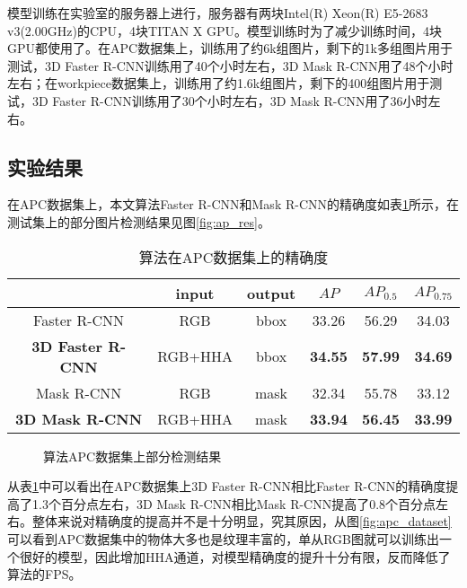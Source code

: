 {\kai 模型训练}在实验室的服务器上进行，服务器有两块Intel(R) Xeon(R) E5-2683 v3(2.00GHz)的CPU，4块TITAN X GPU。模型训练时为了减少训练时间，4块GPU都使用了。在APC数据集上，训练用了约6k组图片，剩下的1k多组图片用于测试，3D Faster R-CNN训练用了40个小时左右，3D Mask R-CNN用了48个小时左右；在workpiece数据集上，训练用了约1.6k组图片，剩下的400组图片用于测试，3D Faster R-CNN训练用了30个小时左右，3D Mask R-CNN用了36小时左右。

\subsection{实验结果}
在APC数据集上，本文算法Faster R-CNN和Mask R-CNN的精确度如表\ref{tab:ap1}所示，在测试集上的部分图片检测结果见图\ref{fig:ap_res}。
\begin{table}[ht]
  \centering
  \caption{算法在APC数据集上的精确度}
    \begin{tabular}{cccccc}
      \toprule
      &input&output&$AP$&$AP_{0.5}$&$AP_{0.75}$ \\
      \midrule
      Faster R-CNN&RGB&bbox&33.26&56.29&34.03 \\
      \bf{3D Faster R-CNN}&RGB+HHA&bbox&\bf{34.55}&\bf{57.99}&\bf{34.69} \\
      Mask R-CNN&RGB&mask&32.34&55.78&33.12 \\
      \bf{3D Mask R-CNN}&RGB+HHA&mask&\bf{33.94}&\bf{56.45}&\bf{33.99} \\
      \bottomrule
    \end{tabular}
  \label{tab:ap1}
\end{table}
\begin{figure}[ht]
  \centering
  \hskip0.2cm
  \hskip0.2cm
  \caption{算法APC数据集上部分检测结果}
  \label{fig:apc_res}
\end{figure}
从表\ref{tab:ap1}中可以看出在APC数据集上3D Faster R-CNN相比Faster R-CNN的精确度提高了1.3个百分点左右，3D Mask R-CNN相比Mask R-CNN提高了0.8个百分点左右。整体来说对精确度的提高并不是十分明显，究其原因，从图\ref{fig:apc_dataset}可以看到APC数据集中的物体大多也是纹理丰富的，单从RGB图就可以训练出一个很好的模型，因此增加HHA通道，对模型精确度的提升十分有限，反而降低了算法的FPS。

